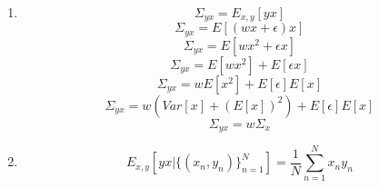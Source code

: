 \documentclass[submit]{harvardml}
\begin{document}
\begin{enumerate}
    \item
    \begin{equation*}
       \Sigma_{yx} = E_{x, y}[yx] 
    \end{equation*}
    \begin{equation*}
       \Sigma_{yx} = E[(wx + \epsilon) x]
    \end{equation*}
    \begin{equation*}
       \Sigma_{yx} = E[wx^2 + \epsilon x]
    \end{equation*}
    \begin{equation*}
       \Sigma_{yx} = E[wx^2] + E[\epsilon x]
    \end{equation*}
    \begin{equation*}
       \Sigma_{yx} = wE[x^2] + E[\epsilon]E[x]
    \end{equation*}
    \begin{equation*}
       \Sigma_{yx} = w(Var[x] + (E[x])^2) + E[\epsilon]E[x]
    \end{equation*}
    \begin{equation*}
       \Sigma_{yx} = w\Sigma_{x}
    \end{equation*}
    
    \bigskip
    \item
    \begin{equation*}
       E_{x, y}[yx | \{(x_n,y_n)\}_{n=1}^N] = \frac{1}{N} \sum_{n=1}^{N} x_n y_n
    \end{equation*}
    

\end{enumerate}
\end{document}
